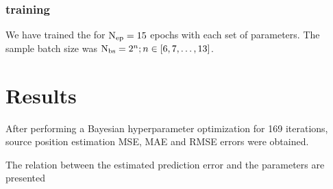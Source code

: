 \documentclass[applsci,article,submit,moreauthors,pdftex]{Definitions/mdpi}
\begin{document}
\subsubsection{\grnn{} training}
We have trained the \grnn{} for $ \mathrm{N}_{\mathrm{ep}} = 15 $ epochs with each set of parameters. The sample batch size was $ \mathrm{N}_{\mathrm{bs}} = 2^n; n \in [6,7,\dots,13] $. 


\section{Results}

After performing a Bayesian hyperparameter optimization for 169 iterations, source position estimation MSE, MAE and RMSE errors were obtained. 

The relation between the estimated prediction error and the parameters are presented \figurename{}
\end{document}
